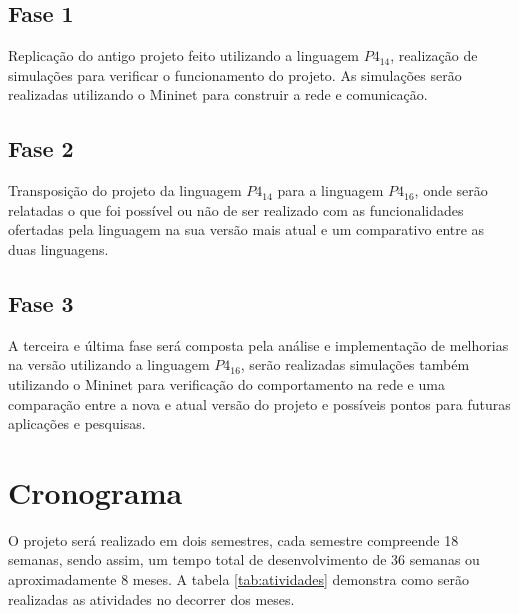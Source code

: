 \documentclass[12pt,
openright, 
oneside,
a4paper,
brazil]{facom-ufu-abntex2}
\theoremstyle{definition}
\begin{document}
\subsection{Fase 1}
Replicação do antigo projeto feito utilizando a linguagem $P4_{14}$, realização de simulações
para verificar o funcionamento do projeto. As simulações serão realizadas utilizando o
Mininet para construir a rede e comunicação.

\subsection{Fase 2}
Transposição do projeto da linguagem $P4_{14}$ para a linguagem $P4_{16}$, onde serão relatadas
o que foi possível ou não de ser realizado com as funcionalidades ofertadas pela linguagem na
sua versão mais atual e um comparativo entre as duas linguagens.

\subsection{Fase 3}
A terceira e última fase será composta pela análise e implementação de melhorias na versão
utilizando a linguagem $P4_{16}$, serão realizadas simulações também utilizando o Mininet
para verificação do comportamento na rede e uma comparação entre a nova e atual versão do
projeto e possíveis pontos para futuras aplicações e pesquisas.

\section{Cronograma}
O projeto será realizado em dois semestres, cada semestre compreende 18 semanas, sendo assim,
um tempo total de desenvolvimento de 36 semanas ou aproximadamente 8 meses. A tabela 
\ref{tab:atividades} demonstra como serão realizadas as atividades no decorrer dos meses. 
\end{document}
